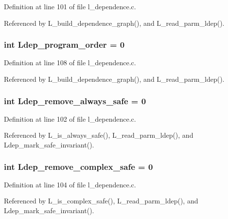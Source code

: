 Definition at line 101 of file l\_\-dependence.c.

Referenced by L\_\-build\_\-dependence\_\-graph(), and L\_\-read\_\-parm\_\-ldep().
\subsubsection{\setlength{\rightskip}{0pt plus 5cm}int \bf{Ldep\_\-program\_\-order} = 0}\label{l__dependence_8c_bb1165b8a3c310ad7eb19f9b87c359e6}




Definition at line 108 of file l\_\-dependence.c.

Referenced by L\_\-build\_\-dependence\_\-graph(), and L\_\-read\_\-parm\_\-ldep().
\subsubsection{\setlength{\rightskip}{0pt plus 5cm}int \bf{Ldep\_\-remove\_\-always\_\-safe} = 0}\label{l__dependence_8c_2f68c5b3a4589bab5b453dabe4ae7a4a}




Definition at line 102 of file l\_\-dependence.c.

Referenced by L\_\-is\_\-always\_\-safe(), L\_\-read\_\-parm\_\-ldep(), and Ldep\_\-mark\_\-safe\_\-invariant().
\subsubsection{\setlength{\rightskip}{0pt plus 5cm}int \bf{Ldep\_\-remove\_\-complex\_\-safe} = 0}\label{l__dependence_8c_511f90417dd270ddcac1a3d75ca2c12b}




Definition at line 104 of file l\_\-dependence.c.

Referenced by L\_\-is\_\-complex\_\-safe(), L\_\-read\_\-parm\_\-ldep(), and Ldep\_\-mark\_\-safe\_\-invariant().
